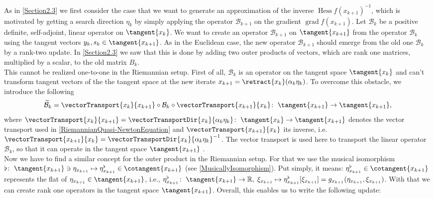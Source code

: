 As in \cref{Section2.3} we first consider the case that we want to generate an approximation of the inverse ${\operatorname{Hess} f(x_{k+1})}^{-1}$, which is motivated by getting a search direction $\eta_k$ by simply applying the operator $\mathcal{B}_{k+1}$ on the gradient $\operatorname{grad}f(x_{k+1})$. Let $\mathcal{B}_k$ be a positive definite, self-adjoint, linear operator on $\tangent{x_k}$. We want to create an operator $\mathcal{B}_{k+1}$ on $\tangent{x_{k+1}}$ from the operator $\mathcal{B}_k$ using the tangent vectors $y_k, s_k \in \tangent{x_{k+1}}$. As in the Euclidean case, the new operator $\mathcal{B}_{k+1}$ should emerge from the old one $\mathcal{B}_{k}$ by a rank-two update. In \cref{Section2.3} we saw that this is done by adding two outer products of vectors, which are rank one matrices, multiplied by a scalar, to the old matrix $B_k$. \\
This cannot be realized one-to-one in the Riemannian setup. First of all, $\mathcal{B}_k$ is an operator on the tangent space $\tangent{x_k}$ and can't transform tangent vectors of the the tangent space at the new iterate $x_{k+1} = \retract{x_{k}}(\alpha_k \eta_k)$. To overcome this obstacle, we introduce the following 
\begin{equation}\label{TransportedOperator}
    \widetilde{\mathcal{B}}_k = \vectorTransport{x_k}{x_{k+1}} \circ \mathcal{B}_k \circ \vectorTransport{x_{k+1}}{x_k} \colon \; \tangent{x_{k+1}} \to \tangent{x_{k+1}},
\end{equation}
where $\vectorTransport{x_k}{x_{k+1}} = \vectorTransportDir{x_k}{\alpha_k \eta_k} \colon \; \tangent{x_k} \to \tangent{x_{k+1}}$ denotes the vector transport used in \cref{RiemannianQuasi-NewtonEquation} and $\vectorTransport{x_{k+1}}{x_k}$ its inverse, i.e. $\vectorTransport{x_{k+1}}{x_k} = {\vectorTransportDir{x_k}{\alpha_k \eta_k}}^{-1}$. The vector transport is used here to transport the linear operator $\mathcal{B}_k$, so that it can operate in the tangent space $\tangent{x_{k+1}}$ \cite[p.~20]{Huang:2013}.\\
Now we have to find a similar concept for the outer product in the Riemannian setup. For that we use the musical isomorphism $\flat \colon \; \tangent{x_{k+1}} \ni \eta_{x_{k+1}} \mapsto \eta^{\flat}_{x_{k+1}} \in \cotangent{x_{k+1}}$ (see \cref{MusicallyIsomorphism}). Put simply, it means: $\eta^{\flat}_{x_{k+1}} \in \cotangent{x_{k+1}}$ represents the ﬂat of $\eta_{x_{k+1}} \in \tangent{x_{k+1}}$, i.e., $\eta^{\flat}_{x_{k+1}} \colon \; \tangent{x_{k+1}} \to \mathbb{R}, \;  \xi_{x_{k+1}} \mapsto \eta^{\flat}_{x_{k+1}}[\xi_{x_{k+1}}] = g_{x_{k+1}} (\eta_{x_{k+1}}, \xi_{x_{k+1}})$. With that we can create rank one operators in the tangent space $\tangent{x_{k+1}}$. Overall, this enables us to write the following update:  
